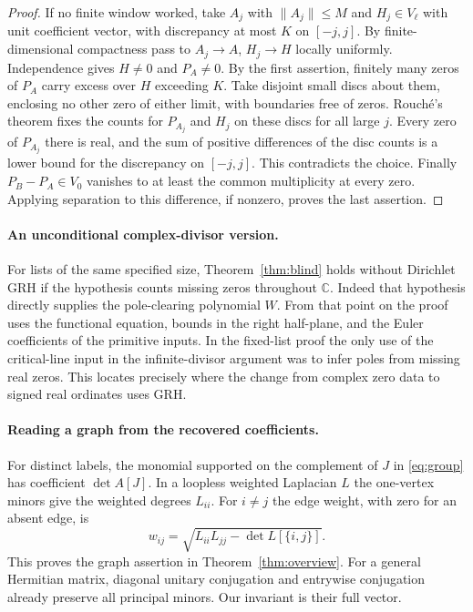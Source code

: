 \documentclass[11pt]{article}
\theoremstyle{remark}\newtheorem{remark}[theorem]{Remark}
\newcommand{\C}{\mathbb C}\newcommand{\R}{\mathbb R}
\begin{document}
\begin{proof}
If no finite window worked, take $A_j$ with $\|A_j\|\le M$ and $H_j\in V_\ell$ with unit coefficient vector, with discrepancy at most $K$ on $[-j,j]$. By finite-dimensional compactness pass to $A_j\to A$, $H_j\to H$ locally uniformly. Independence gives $H\ne0$ and $P_A\ne0$. By the first assertion, finitely many zeros of $P_A$ carry excess over $H$ exceeding $K$. Take disjoint small discs about them, enclosing no other zero of either limit, with boundaries free of zeros. Rouch\'e's theorem fixes the counts for $P_{A_j}$ and $H_j$ on these discs for all large $j$. Every zero of $P_{A_j}$ there is real, and the sum of positive differences of the disc counts is a lower bound for the discrepancy on $[-j,j]$. This contradicts the choice. Finally $P_B-P_A\in V_0$ vanishes to at least the common multiplicity at every zero. Applying separation to this difference, if nonzero, proves the last assertion.
\end{proof}


\paragraph{An unconditional complex-divisor version.}
For lists of the same specified size, Theorem~\ref{thm:blind} holds without Dirichlet GRH if the hypothesis counts missing zeros throughout $\C$. Indeed that hypothesis directly supplies the pole-clearing polynomial $W$. From that point on the proof uses the functional equation, bounds in the right half-plane, and the Euler coefficients of the primitive inputs. In the fixed-list proof the only use of the critical-line input in the infinite-divisor argument was to infer poles from missing real zeros. This locates precisely where the change from complex zero data to signed real ordinates uses GRH.

\paragraph{Reading a graph from the recovered coefficients.}
For distinct labels, the monomial supported on the complement of $J$ in \eqref{eq:group} has coefficient $\det A[J]$. In a loopless weighted Laplacian $L$ the one-vertex minors give the weighted degrees $L_{ii}$. For $i\ne j$ the edge weight, with zero for an absent edge, is
\[
 w_{ij}=\sqrt{L_{ii}L_{jj}-\det L[\{i,j\}]} .
\]
This proves the graph assertion in Theorem~\ref{thm:overview}. For a general Hermitian matrix, diagonal unitary conjugation and entrywise conjugation already preserve all principal minors. Our invariant is their full vector.
\end{document}
